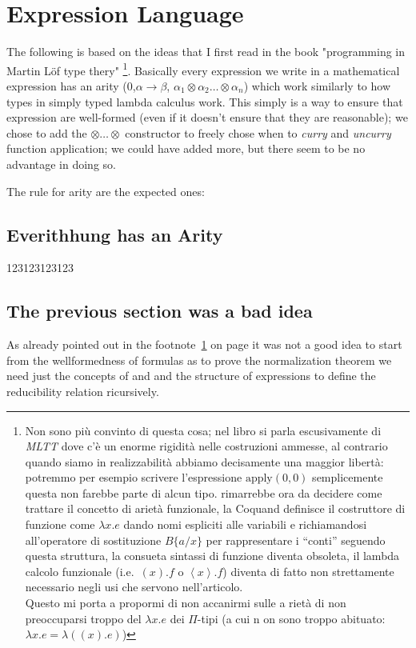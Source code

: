 
\chapter{Expression Language}
	The following is based on the ideas that I first read in the book "programming in Martin Löf type thery" 
	\footnote{\label{qwe13}Non sono più convinto di questa cosa; nel libro si parla escusivamente di \emph{MLTT} dove c'è un enorme rigidità nelle costruzioni ammesse, al contrario quando siamo in realizzabilità abbiamo decisamente una maggior libertà: potremmo per esempio scrivere l'espressione $\text{apply}(0,0)$ semplicemente questa non farebbe parte di alcun tipo.
	rimarrebbe ora da decidere come trattare il concetto di arietà funzionale, la Coquand definisce il costruttore di funzione come $\lambda x . e$ dando nomi espliciti alle variabili e richiamandosi all'operatore di sostituzione $B\{a/x\}$ per rappresentare i ``conti'' seguendo questa struttura, la consueta sintassi di funzione diventa obsoleta, il lambda calcolo funzionale (i.e.\ $(x).f$ o $\left\langle x\right\rangle.f$) diventa di fatto non strettamente necessario negli usi che servono nell'articolo. \\
	Questo mi porta a propormi di non accanirmi sulle a
	rietà di non preoccuparsi troppo del $\lambda x.e$ dei $\Pi$-tipi (a cui n
	on sono troppo abituato: $\lambda x.e 
	= \lambda ((x).e)$) 
	}. 
	Basically every expression we write in a mathematical expression has an arity (0,$\alpha\rightarrow\beta$, $\alpha_1\otimes\alpha_2\ldots\otimes\alpha_n$) which work similarly to how types in simply typed lambda calculus work. 
	This simply is a way to ensure that expression are well-formed (even if it doesn't ensure that they are reasonable); we chose to add the $\otimes\ldots\otimes$ constructor to freely chose when to \emph{curry} and \emph{uncurry} function application; we could have added more, but there seem to be no advantage in doing so.
	
	The rule for arity are the expected ones:
	
	\section{Everithhung has an Arity} 
		123123123123
	\section{The previous section was a bad idea}
		As already pointed out in the footnote~\ref{qwe13} on page \pageref{qwe13} it was not a good idea to start from the wellformedness of formulas as to prove the normalization theorem we need just the concepts of  
		and  and the  structure of expressions to define the reducibility relation ricursively.
		

